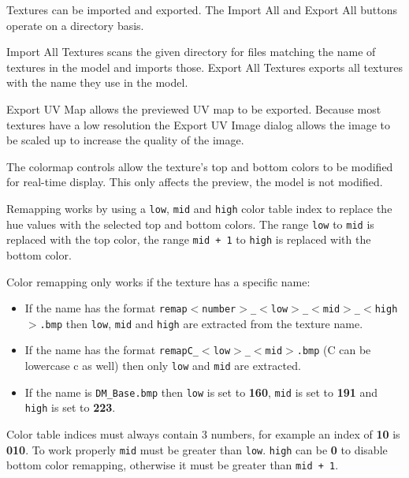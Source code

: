 \documentclass[10pt, a4paper, titlepage, oneside]{article}
\newcommand{\code}[1]{\mbox{\texttt{#1}}}
\begin{document}
\vspace{\baselineskip}
Textures can be imported and exported. The Import All and Export All buttons operate on a directory basis.

\vspace{\baselineskip}
Import All Textures scans the given directory for files matching the name of textures in the model and imports those. Export All Textures exports all textures with the name they use in the model.

\vspace{\baselineskip}
Export UV Map allows the previewed UV map to be exported. Because most textures have a low resolution the Export UV Image dialog allows the image to be scaled up to increase the quality of the image.

\vspace{\baselineskip}
The colormap controls allow the texture's top and bottom colors to be modified for real-time display. This only affects the preview, the model is not modified.

\vspace{\baselineskip}
Remapping works by using a \code{low}, \code{mid} and \code{high} color table index to replace the hue values with the selected top and bottom colors. The range \code{low} to \code{mid} is replaced with the top color, the range \code{mid + 1} to \code{high} is replaced with the bottom color.

\vspace{\baselineskip}
Color remapping only works if the texture has a specific name:

\begin{itemize}
\item If the name has the format \code{remap$<$number$>$\_$<$low$>$\_$<$mid$>$\_$<$high$>$.bmp} then \code{low}, \code{mid} and \code{high} are extracted from the texture name.
\item If the name has the format \code{remapC\_$<$low$>$\_$<$mid$>$.bmp} (C can be lowercase c as well) then only \code{low} and \code{mid} are extracted.
\item If the name is \code{DM\_Base.bmp} then \code{low} is set to \textbf{160}, \code{mid} is set to \textbf{191} and \code{high} is set to \textbf{223}.
\end{itemize}

Color table indices must always contain 3 numbers, for example an index of \textbf{10} is \textbf{010}. To work properly \code{mid} must be greater than \code{low}. \code{high} can be \textbf{0} to disable bottom color remapping, otherwise it must be greater than \code{mid + 1}.
\end{document}
